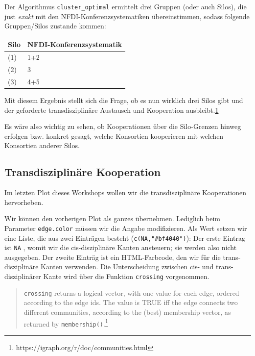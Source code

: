 \documentclass[11pt]{article}
\begin{document}
    Der Algorithmus \texttt{cluster\_optimal} ermittelt drei Gruppen (oder
auch Silos), die just \emph{exakt} mit den NFDI-Konferenzsystematiken
übereinstimmen, sodass folgende Gruppen/Silos zustande kommen:

\begin{longtable}[]{@{}ll@{}}
\toprule
Silo & NFDI-Konferenzsystematik\tabularnewline
\midrule
\endhead
(1) & 1+2\tabularnewline
(2) & 3\tabularnewline
(3) & 4+5\tabularnewline
\bottomrule
\end{longtable}

Mit diesem Ergebnis stellt sich die Frage, ob es nun wirklich drei Silos
gibt und der geforderte transdisziplinäre Austausch und Kooperation
ausbleibt.\href{https://www.youtube.com/watch?v=YmuUT8HkXxY\&feature=youtu.be\&t=904}{1}

Es wäre also wichtig zu sehen, ob Kooperationen über die Silo-Grenzen
hinweg erfolgen bzw. konkret gesagt, welche Konsortien kooperieren mit
welchen Konsortien anderer Silos.

    \hypertarget{transdisziplinuxe4re-kooperation}{%
\subsection{Transdisziplinäre
Kooperation}\label{transdisziplinuxe4re-kooperation}}

Im letzten Plot dieses Workshops wollen wir die transdisziplinäre
Kooperationen hervorheben.

Wir können den vorherigen Plot als ganzes übernehmen. Lediglich beim
Parameter \texttt{edge.color} müssen wir die Angabe modifizieren. Als
Wert setzen wir eine Liste, die aus zwei Einträgen besteht
(\texttt{c(NA,"\#bf4040")}): Der erste Eintrag ist \texttt{NA} , womit
wir die cis-disziplinäre Kanten ansteuern; sie werden also nicht
ausgegeben. Der zweite Einträg ist ein HTML-Farbcode, den wir für die
trans-disziplinäre Kanten verwenden. Die Unterscheidung zwischen cis-
und trans-disziplinärer Kante wird über die Funktion \texttt{crossing}
vorgenommen.

\begin{quote}
\texttt{crossing} returns a logical vector, with one value for each
edge, ordered according to the edge ids. The value is TRUE iff the edge
connects two different communities, according to the (best) membership
vector, as returned by \texttt{membership()}.\footnote{https://igraph.org/r/doc/communities.html}
\end{quote}
\end{document}
